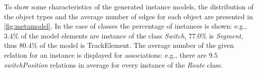 To show some characteristics of the generated instance models, the distribution of the object types and the average number of edges for each object are presented in \autoref{fig:metamodel}. In the case of classes the percentage of instances is shown: e.g., $3.4\%$ of the model elements are instance of the class \emph{Switch}, $77.0\%$ is \emph{Segment}, thus $80.4\%$ of the model is TrackElement. The average number of the given relation for an instance is displayed for associations: e.g., there are $9.5$ \emph{switchPosition} relations in average for every instance of the \emph{Route} class.